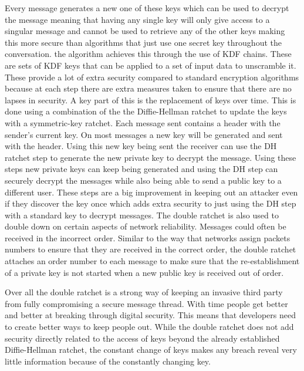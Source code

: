 \documentclass{article}
\begin{document}
Every message generates a new one of these keys which can be used to decrypt the message meaning that having any single key will only give access to a singular message and cannot be used to retrieve any of the other keys making this more secure than algorithms that just use one secret key throughout the conversation. the algorithm achieves this through the use of KDF chains. These are sets of KDF keys that can be applied to a set of input data to unscramble it. These provide a lot of extra security compared to standard encryption algorithms because at each step there are extra measures taken to ensure that there are no lapses in security. A key part of this is the replacement of keys over time. This is done using a combination of the the Diffie-Hellman ratchet to update the keys with a symmetric-key ratchet. Each message sent contains a header with the sender's current key. On most messages a new key will be generated and sent with the header. Using this new key being sent the receiver can use the DH ratchet step to generate the new private key to decrypt the message. Using these steps new private keys can keep being generated and using the DH step can securely decrypt the messages while also being able to send a public key to a different user. These steps are a big improvement in keeping out an attacker even if they discover the key once which adds extra security to just using the DH step with a standard key to decrypt messages.\newline
 The double ratchet is also used to double down on certain aspects of network reliability. Messages could often be received in the incorrect order. Similar to the way that networks assign packets numbers to ensure that they are received in the correct order, the double ratchet attaches an order number to each message to make sure that the re-establishment of a private key is not started when a new public key is received out of order.\newline
 
 Over all the double ratchet is a strong way of keeping an invasive third party from fully compromising a secure message thread. With time people get better and better at breaking through digital security. This means that developers need to create better ways to keep people out. While the double ratchet does not add security directly related to the access of keys beyond the already established Diffie-Hellman ratchet, the constant change of keys makes any breach reveal very little information because of the constantly changing key.\newline
 
\end{document}
